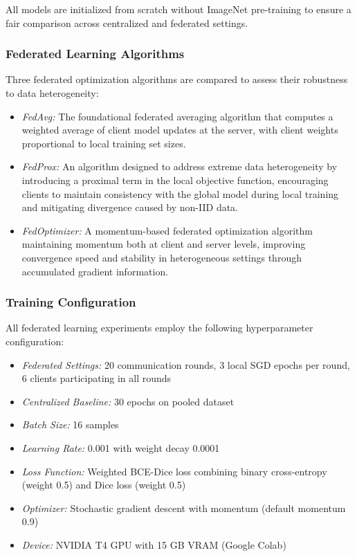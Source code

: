 \documentclass[conference]{IEEEtran}
\begin{document}
All models are initialized from scratch without ImageNet pre-training to ensure a fair comparison across centralized and federated settings.

\subsubsection{Federated Learning Algorithms}
Three federated optimization algorithms are compared to assess their robustness to data heterogeneity:

\begin{itemize}
\item \emph{FedAvg:} The foundational federated averaging algorithm that computes a weighted average of client model updates at the server, with client weights proportional to local training set sizes.

\item \emph{FedProx:} An algorithm designed to address extreme data heterogeneity by introducing a proximal term in the local objective function, encouraging clients to maintain consistency with the global model during local training and mitigating divergence caused by non-IID data.

\item \emph{FedOptimizer:} A momentum-based federated optimization algorithm maintaining momentum both at client and server levels, improving convergence speed and stability in heterogeneous settings through accumulated gradient information.
\end{itemize}

\subsubsection{Training Configuration}
All federated learning experiments employ the following hyperparameter configuration:

\begin{itemize}
\item \emph{Federated Settings:} 20 communication rounds, 3 local SGD epochs per round, 6 clients participating in all rounds
\item \emph{Centralized Baseline:} 30 epochs on pooled dataset
\item \emph{Batch Size:} 16 samples
\item \emph{Learning Rate:} 0.001 with weight decay 0.0001
\item \emph{Loss Function:} Weighted BCE-Dice loss combining binary cross-entropy (weight 0.5) and Dice loss (weight 0.5)
\item \emph{Optimizer:} Stochastic gradient descent with momentum (default momentum 0.9)
\item \emph{Device:} NVIDIA T4 GPU with 15 GB VRAM (Google Colab)
\end{itemize}
\end{document}
